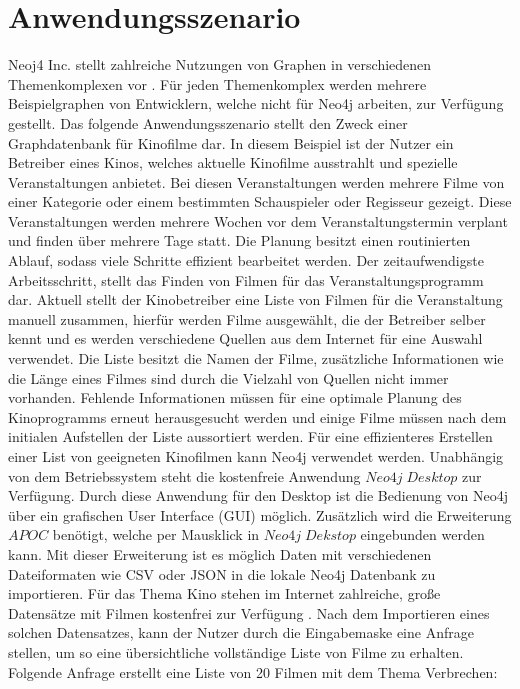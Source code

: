 \section{Anwendungsszenario}
Neoj4 Inc. stellt zahlreiche Nutzungen von Graphen in verschiedenen Themenkomplexen vor \parencite{Examples}. Für jeden Themenkomplex werden mehrere Beispielgraphen von Entwicklern, welche nicht für Neo4j arbeiten, zur Verfügung gestellt. Das folgende Anwendungsszenario stellt den Zweck einer Graphdatenbank für Kinofilme dar.\newline
In diesem Beispiel ist der Nutzer ein Betreiber eines Kinos, welches aktuelle Kinofilme ausstrahlt und spezielle Veranstaltungen anbietet. Bei diesen Veranstaltungen werden mehrere Filme von einer Kategorie oder einem bestimmten Schauspieler oder Regisseur gezeigt. Diese Veranstaltungen werden mehrere Wochen vor dem Veranstaltungstermin verplant und finden über mehrere Tage statt. Die Planung besitzt einen routinierten Ablauf, sodass viele Schritte effizient bearbeitet werden. Der zeitaufwendigste Arbeitsschritt, stellt das Finden von Filmen für das Veranstaltungsprogramm dar. \newline
Aktuell stellt der Kinobetreiber eine Liste von Filmen für die Veranstaltung manuell zusammen, hierfür werden Filme ausgewählt, die der Betreiber selber kennt und es werden verschiedene Quellen aus dem Internet für eine Auswahl verwendet. Die Liste besitzt die Namen der Filme, zusätzliche Informationen wie die Länge eines Filmes sind durch die Vielzahl von Quellen nicht immer vorhanden. Fehlende Informationen müssen für eine optimale Planung des Kinoprogramms erneut herausgesucht werden und einige Filme müssen nach dem initialen Aufstellen der Liste aussortiert werden. \newline  
Für eine effizienteres Erstellen einer List von geeigneten Kinofilmen kann Neo4j verwendet werden. Unabhängig von dem Betriebssystem steht die kostenfreie Anwendung $Neo4j\; Desktop$ zur Verfügung. Durch diese Anwendung für den Desktop ist die Bedienung von Neo4j über ein grafischen User Interface (GUI) möglich. Zusätzlich wird die Erweiterung $APOC$ benötigt, welche per Mausklick in $Neo4j\; Dekstop$ eingebunden werden kann. Mit dieser Erweiterung ist es möglich Daten mit verschiedenen Dateiformaten wie CSV oder JSON in die lokale Neo4j Datenbank zu importieren. Für das Thema Kino stehen im Internet zahlreiche, große Datensätze mit Filmen kostenfrei zur Verfügung \parencite{Kaggle}. Nach dem Importieren eines solchen Datensatzes, kann der Nutzer durch die Eingabemaske eine Anfrage stellen, um so eine übersichtliche vollständige Liste von Filme zu erhalten. Folgende Anfrage erstellt eine Liste von 20 Filmen mit dem Thema Verbrechen: 
